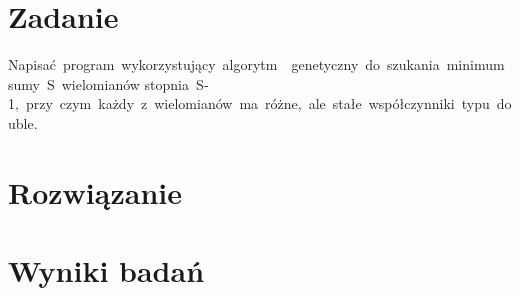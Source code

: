 

\def\titlelinea{Wydział Informatyki}
\def\titlelineb{Katedra Oprogramowania}
\def\titlelinec{Obliczenia równoległe}
\def\titlelined{Temat: Skalowalność algorytmów genetycznych}
\def\wykonawca{inż. Rafał Selewońko}
\def\promotor{mgr inż. Paweł Zabielski}
\def\promotorstring{Prowadzący: } 
\def\data{24 stycznia 2014}





\chapter{Zadanie}

Napisać program wykorzystujący algorytm  genetyczny do szukania minimum sumy S wielomianów
stopnia S­1, przy czym każdy z wielomianów ma różne, ale stałe współczynniki typu double.

\chapter{Rozwiązanie}





\noindent\begin{minipage}{\linewidth}

\end{minipage}

\noindent\begin{minipage}{\linewidth}

\end{minipage}

\noindent\begin{minipage}{\linewidth}

\end{minipage}

\noindent\begin{minipage}{\linewidth}

\end{minipage}

\chapter{Wyniki badań}

